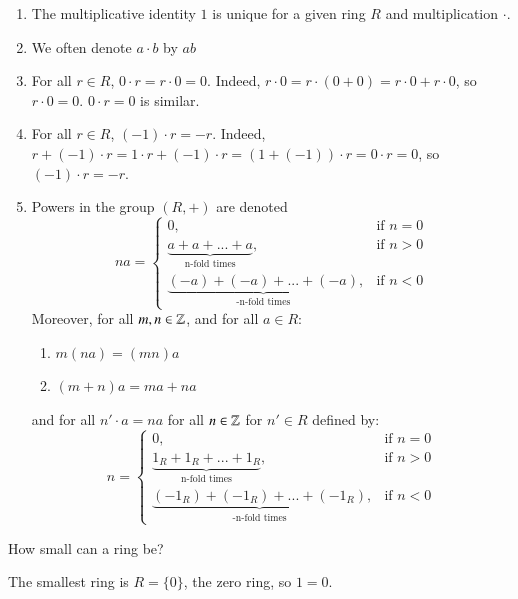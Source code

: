 \documentclass[12pt, a4paper, oneside, openright, titlepage]{book}
\begin{document}
\begin{rmk}
    \leavevmode
    \begin{enumerate}
        \item The multiplicative identity $1$ is unique for a given ring $R$ and multiplication $\cdot$.
        \item We often denote $a \cdot b$ by $ab$
        \item For all $r \in R$, $0\cdot r = r \cdot 0 = 0$. Indeed, $r\cdot 0 = r\cdot (0+0) = r\cdot 0+r\cdot 0$, so $r \cdot 0 = 0$. $0\cdot r = 0$ is similar.
        \item For all $r \in R$, $(-1)\cdot r = -r$. Indeed, $r + (-1)\cdot r = 1\cdot r + (-1)\cdot r = (1+(-1))\cdot r = 0\cdot r = 0$, so $(-1)\cdot r = -r$.
        \item Powers in the group $(R,+)$ are denoted \begin{equation}
            na = \left\{\begin{array}{ll} 0, & \text{if } n = 0 \\ \underbrace{a+a + ... +a}_{\text{n-fold times}}, & \text{if } n > 0 \\ \underbrace{(-a)+ (-a) + ... + (-a)}_{\text{-n-fold times}}, & \text{if } n < 0\end{array}\right.
        \end{equation}
        Moreover, for all $m,n \in \mathbb Z$, and for all $a \in R$:
        \begin{enumerate}
            \item $m(na) = (mn)a$
            \item $(m+n)a = ma+na$
        \end{enumerate}
        and for all $n'\cdot a = na$ for all $n \in \mathbb Z$ for $n' \in R$ defined by: \begin{equation}
            n = \left\{\begin{array}{ll} 0, & \text{if } n = 0 \\ \underbrace{1_R+1_R + ... +1_R}_{\text{n-fold times}}, & \text{if } n > 0 \\ \underbrace{(-1_R)+ (-1_R) + ... + (-1_R)}_{\text{-n-fold times}}, & \text{if } n < 0\end{array}\right.
        \end{equation}
    \end{enumerate}
\end{rmk}

\begin{qest}
    How small can a ring be?
\end{qest}
\begin{ans}
    The smallest ring is $R = \{0\}$, the zero ring, so $1 = 0$.
\end{ans}
\end{document}
